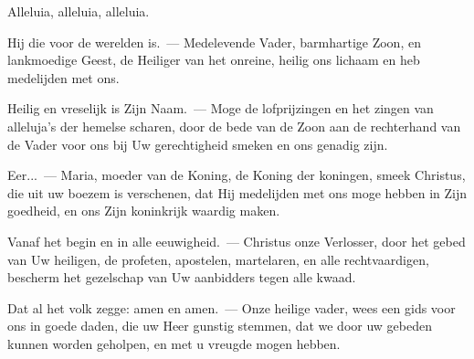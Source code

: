 \documentclass[12pt,twoside,a5paper]{article}
\begin{document}
\begin{halfparskip}
   Alleluia, alleluia, alleluia.
\end{halfparskip}



\begin{halfparskip}
   Hij die voor de werelden is.~--- Medelevende Vader, barmhartige Zoon, en lankmoedige Geest, de Heiliger van het onreine, heilig ons lichaam en heb medelijden met ons.

  Heilig en vreselijk is Zijn Naam.~--- Moge de lofprijzingen en het zingen van alleluja's der hemelse scharen, door de bede van de Zoon aan de rechterhand van de Vader voor ons bij Uw gerechtigheid smeken en ons genadig zijn.

  Eer...~--- Maria, moeder van de Koning, de Koning der koningen, smeek Christus, die uit uw boezem is verschenen, dat Hij medelijden met ons moge hebben in Zijn goedheid, en ons Zijn koninkrijk waardig maken.

  Vanaf het begin en in alle eeuwigheid.~--- Christus onze Verlosser, door het gebed van Uw heiligen, de profeten, apostelen, martelaren, en alle rechtvaardigen, bescherm het gezelschap van Uw aanbidders tegen alle kwaad.

  Dat al het volk zegge: amen en amen.~--- Onze heilige vader, wees een gids voor ons in goede daden, die uw Heer gunstig stemmen, dat we door uw gebeden kunnen worden geholpen, en met u vreugde mogen hebben.
\end{halfparskip}
\end{document}
